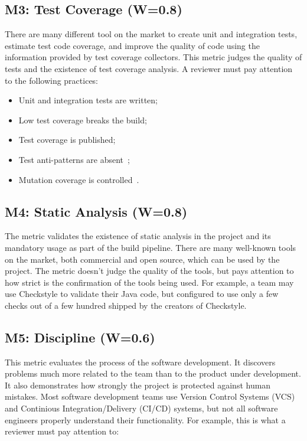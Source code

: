 \documentclass[12pt,oneside]{article}
\begin{document}
\subsection{M3: Test Coverage (W=0.8)}

There are many different tool on the market to create unit and integration tests,
estimate test code coverage, and improve the quality of code using
the information provided by test coverage collectors. This metric judges
the quality of tests and the existence of test coverage analysis. A reviewer
must pay attention to the following practices:

\begin{itemize}
  \item Unit and integration tests are written;
  \item Low test coverage breaks the build;
  \item Test coverage is published;
  \item Test anti-patterns are absent~\citep{yb-test-anti};
  \item Mutation coverage is controlled~\citep{andrews2006using}.
\end{itemize}

\subsection{M4: Static Analysis (W=0.8)}

The metric validates the existence of static analysis in the project
and its mandatory usage as part of the build pipeline.
There are many well-known tools on the market, both commercial and
open source, which can be used by the project. The metric doesn't judge
the quality of the tools, but pays attention to how strict is the
confirmation of the tools being used. For example, a team may use Checkstyle
to validate their Java code, but configured to use only a few checks
out of a few hundred shipped by the creators of Checkstyle.

\subsection{M5: Discipline (W=0.6)}

This metric evaluates the process of the software
development. It discovers problems much more related to the team than
to the product under development. It also demonstrates how strongly the project is
protected against human mistakes. Most software development teams use
Version Control Systems (VCS) and Continious Integration/Delivery (CI/CD) systems, but not all
software engineers properly understand their functionality. For example, this is what
a reviewer must pay attention to:
\end{document}
